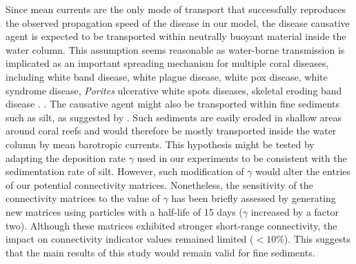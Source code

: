 \documentclass[utf8]{frontiersSCNS}
\newcommand{\dobby}[1]{\textbf{\color{violet}{#1}}}
\begin{document}
Since mean currents are the only mode of transport that successfully reproduces the observed propagation speed of the disease in our model, the disease causative agent is expected to be transported within neutrally buoyant material inside the water column. This assumption seems reasonable as water-borne transmission is implicated as an important spreading mechanism for multiple coral diseases, including white band disease, white plague disease, white pox disease, white syndrome disease, \textit{Porites} ulcerative white spots diseases, skeletal eroding band disease \citep{shore2019modes}. \dobby{[examples of neutrally buoyant vectors ? mucus ?]}. The causative agent might also be transported within fine sediments such as silt, as suggested by \cite{rosales2020rhodobacterales}. Such sediments are easily eroded in shallow areas around coral reefs and would therefore be mostly transported inside the water column by mean barotropic currents. This hypothesis might be tested by adapting the deposition rate $\gamma$ used in our experiments to be consistent with the sedimentation rate of silt. However, such modification of $\gamma$ would alter the entries of our potential connectivity matrices. Nonetheless, the sensitivity of the connectivity matrices to the value of $\gamma$ has been briefly assessed by generating new matrices using particles with a half-life of 15 days ($\gamma$ increased by a factor two). Although these matrices exhibited stronger short-range connectivity, the impact on connectivity indicator values remained  limited ($<10\%$). This suggests that the main results of this study would remain valid for fine sediments.  

\end{document}
